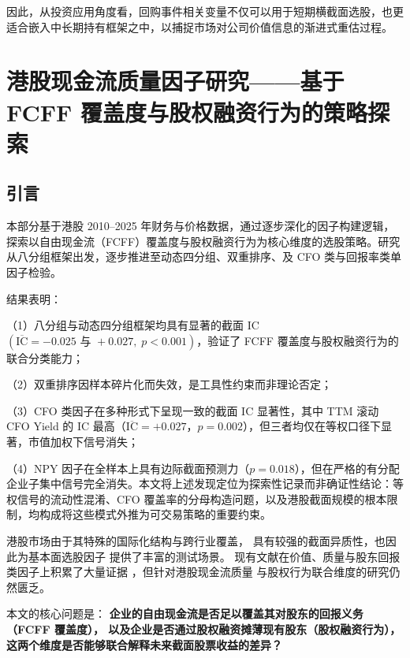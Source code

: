 \documentclass[a4paper,10pt]{article}
\begin{document}
因此，从投资应用角度看，回购事件相关变量不仅可以用于短期横截面选股，也更适合嵌入中长期持有框架之中，以捕捉市场对公司价值信息的渐进式重估过程。













\section{港股现金流质量因子研究——基于 FCFF 覆盖度与股权融资行为的策略探索}

\subsection{引言}

本部分基于港股 2010--2025 年财务与价格数据，通过逐步深化的因子构建逻辑，探索以自由现金流（FCFF）覆盖度与股权融资行为为核心维度的选股策略。研究从八分组框架出发，逐步推进至动态四分组、双重排序、及 CFO 类与回报率类单因子检验。 

结果表明：

（1）八分组与动态四分组框架均具有显著的截面 IC\((\overline{\mathrm{IC}}=-0.025\text{ 与 }+0.027,\;p<0.001)\)，验证了 FCFF 覆盖度与股权融资行为的联合分类能力；

（2）双重排序因样本碎片化而失效，是工具性约束而非理论否定；

（3）CFO 类因子在多种形式下呈现一致的截面 IC 显著性，其中 TTM 滚动 CFO Yield 的 IC 最高（$\overline{\mathrm{IC}}=+0.027$，$p=0.002$），但三者均仅在等权口径下显著，市值加权下信号消失；

（4）NPY 因子在全样本上具有边际截面预测力（$p=0.018$），但在严格的有分配企业子集中信号完全消失。本文将上述发现定位为探索性记录而非确证性结论：等权信号的流动性混淆、CFO 覆盖率的分母构造问题，以及港股截面规模的根本限制，均构成将这些模式外推为可交易策略的重要约束。


        
港股市场由于其特殊的国际化结构与跨行业覆盖，
具有较强的截面异质性，也因此为基本面选股因子
提供了丰富的测试场景。
现有文献在价值、质量与股东回报类因子上积累了大量证据
\citep{fama1992, novy2013}，但针对港股现金流质量
与股权行为联合维度的研究仍然匮乏。

本文的核心问题是：
\textbf{企业的自由现金流是否足以覆盖其对股东的回报义务（FCFF 覆盖度），
以及企业是否通过股权融资摊薄现有股东（股权融资行为），
这两个维度是否能够联合解释未来截面股票收益的差异？}
\end{document}
